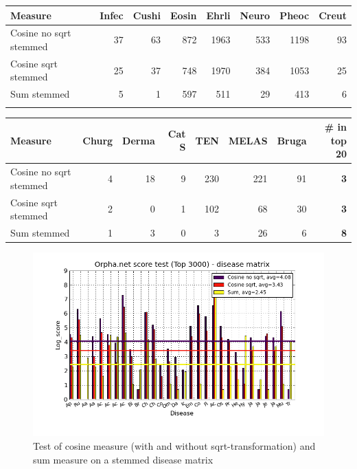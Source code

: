 \begin{table}[H]
  \begin{tiny}
    \begin{tabular}{|l|r|r|r|r|r|r|r|}
      \hline
      Measure &Infec&Cushi&Eosin&Ehrli&Neuro&Pheoc&Creut \\
      \hline
      Cosine no sqrt stemmed &37&63&872&1963&533&1198&93 \\
      \hline
      Cosine sqrt stemmed &25&37&748&1970&384&1053&25 \\
      \hline
      Sum stemmed &5&1&597&511&29&413&6 \\
      \hline
      \multicolumn{8}{c}{} \\
    \end{tabular}
    \begin{tabular}{|l|r|r|r|r|r|r|r|}
      \hline
      Measure &Churg&Derma&Cat S&TEN&MELAS&Bruga& \scriptsize{\textbf{\# in top 20}} \\
      \hline
      Cosine no sqrt stemmed &4&18&9&230&221&91 &\scriptsize{\textbf{3}} \\
      \hline
      Cosine sqrt stemmed &2&0&1&102&68&30 &  \scriptsize{\textbf{3}}\\
      \hline
      Sum stemmed &1&3&0&3&26&6 & \scriptsize{\textbf{8}} \\
      \hline
    \end{tabular}
  \end{tiny}
\end{table}

\begin{figure}[H]
  \caption{Test of cosine measure (with and without sqrt-transformation) and sum measure on a stemmed disease matrix}
  \begin{center}
    \includegraphics[width=1.2\textwidth]{barcharts/diseaseMatrix_orphan_hist_NOTnorm_3000_s_cos_sqrt_cos_sum_nn.png}
  \end{center}
  \label{diseaseMatrix_orphan_hist_NOTnorm_3000_s_cos_sqrt_cos_sum_nn}
\end{figure}

